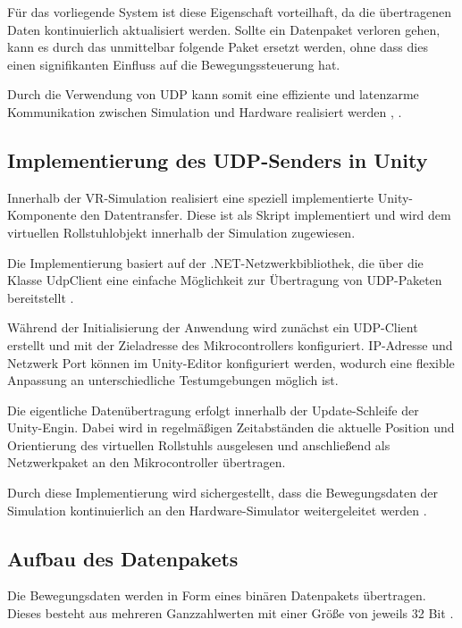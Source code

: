 Für das vorliegende System ist diese Eigenschaft vorteilhaft, da die übertragenen Daten kontinuierlich aktualisiert werden. Sollte ein Datenpaket verloren gehen, kann es durch das unmittelbar folgende Paket ersetzt werden, ohne dass dies einen signifikanten Einfluss auf die Bewegungssteuerung hat.

Durch die Verwendung von UDP kann somit eine effiziente und latenzarme Kommunikation zwischen Simulation und Hardware realisiert werden \cite{Postel1980}, \cite{Peterson2007}.

\subsection{Implementierung des UDP-Senders in Unity}
Innerhalb der VR-Simulation realisiert eine speziell implementierte Unity-Komponente den Datentransfer. Diese ist als Skript implementiert und wird dem virtuellen Rollstuhlobjekt innerhalb der Simulation zugewiesen.

Die Implementierung basiert auf der .NET-Netzwerkbibliothek, die über die Klasse UdpClient eine einfache Möglichkeit zur Übertragung von UDP-Paketen bereitstellt \cite{Microsoft}.

Während der Initialisierung der Anwendung wird zunächst ein UDP-Client erstellt und mit der Zieladresse des Mikrocontrollers konfiguriert. IP-Adresse und Netzwerk Port können im Unity-Editor konfiguriert werden, wodurch eine flexible Anpassung an unterschiedliche Testumgebungen möglich ist.

Die eigentliche Datenübertragung erfolgt innerhalb der Update-Schleife der Unity-Engin. Dabei wird in regelmäßigen Zeitabständen die aktuelle Position und Orientierung des virtuellen Rollstuhls ausgelesen und anschließend als Netzwerkpaket an den Mikrocontroller übertragen.

Durch diese Implementierung wird sichergestellt, dass die Bewegungsdaten der Simulation kontinuierlich an den Hardware-Simulator weitergeleitet werden \cite{Microsoft}.

\subsection{Aufbau des Datenpakets}
Die Bewegungsdaten werden in Form eines binären Datenpakets übertragen. Dieses besteht aus mehreren Ganzzahlwerten mit einer Größe von jeweils 32 Bit \cite{Microsoft}.

